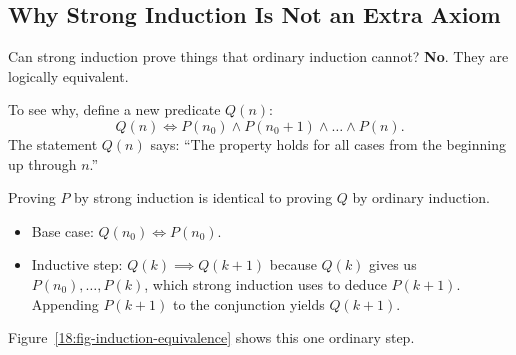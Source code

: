\subsection{Why Strong Induction Is Not an Extra Axiom}

Can strong induction prove things that ordinary induction cannot? \textbf{No}. They are logically equivalent.

To see why, define a new predicate $Q(n)$:
\[
Q(n) \iff P(n_0) \land P(n_0 + 1) \land \dots \land P(n).
\]
The statement $Q(n)$ says: ``The property holds for all cases from the beginning up through $n$.'' 

Proving $P$ by strong induction is identical to proving $Q$ by ordinary induction.
\begin{itemize}
\item Base case: $Q(n_0) \iff P(n_0)$.
\item Inductive step: $Q(k) \implies Q(k+1)$ because $Q(k)$ gives us $P(n_0), \dots, P(k)$, which strong induction uses to deduce $P(k+1)$. Appending $P(k+1)$ to the conjunction yields $Q(k+1)$.
\end{itemize}
Figure~\ref{18:fig-induction-equivalence} shows this one ordinary step.

